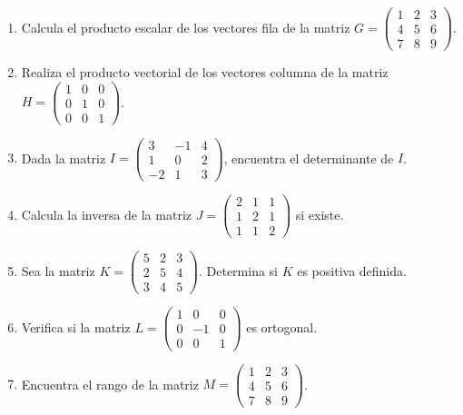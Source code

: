 \documentclass[10pt,a4paper]{article}
\begin{document}
\begin{enumerate}[resume]
    \item Calcula el producto escalar de los vectores fila de la matriz $G = \begin{pmatrix} 1 & 2 & 3 \\ 4 & 5 & 6 \\ 7 & 8 & 9 \end{pmatrix}$.

    \item Realiza el producto vectorial de los vectores columna de la matriz $H = \begin{pmatrix} 1 & 0 & 0 \\ 0 & 1 & 0 \\ 0 & 0 & 1 \end{pmatrix}$.

    \item Dada la matriz $I = \begin{pmatrix} 3 & -1 & 4 \\ 1 & 0 & 2 \\ -2 & 1 & 3 \end{pmatrix}$, encuentra el determinante de $I$.

    \item Calcula la inversa de la matriz $J = \begin{pmatrix} 2 & 1 & 1 \\ 1 & 2 & 1 \\ 1 & 1 & 2 \end{pmatrix}$ si existe.

    \item Sea la matriz $K = \begin{pmatrix} 5 & 2 & 3 \\ 2 & 5 & 4 \\ 3 & 4 & 5 \end{pmatrix}$. Determina si $K$ es positiva definida.

    \item Verifica si la matriz $L = \begin{pmatrix} 1 & 0 & 0 \\ 0 & -1 & 0 \\ 0 & 0 & 1 \end{pmatrix}$ es ortogonal.

    \item Encuentra el rango de la matriz $M = \begin{pmatrix} 1 & 2 & 3 \\ 4 & 5 & 6 \\ 7 & 8 & 9 \end{pmatrix}$.


\end{enumerate}
\end{document}
